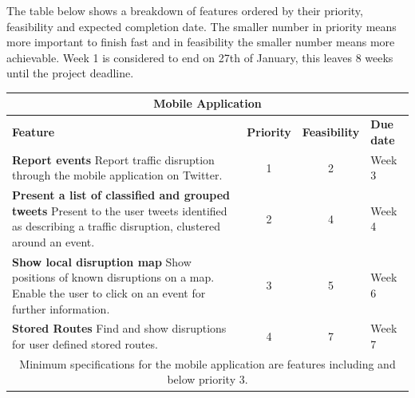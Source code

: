 The table below shows a breakdown of features ordered by their priority, feasibility and expected completion date. The smaller number in priority means more important to finish fast and in feasibility the smaller number means more achievable. Week 1 is considered to end on 27th of January, this leaves 8 weeks until the project deadline.

\begin{center}
\begin{tabular}{ | p{9cm} | c | c | p{1.8cm} | }
\hline
\multicolumn{4}{|c|}{\textbf{Mobile Application}} \\ \hline
\textbf{Feature} & \textbf{Priority} & \textbf{Feasibility} & \textbf{Due date} \\ \hline
\textbf{Report events}\newline
Report traffic disruption through the mobile application on Twitter. & 1 & 2 & Week 3 \\ \hline
\textbf{Present a list of classified and grouped tweets}\newline
Present to the user tweets identified as describing a traffic disruption,
clustered around an event. & 2 & 4 & Week 4 \\ \hline
\textbf{Show local disruption map}\newline
Show positions of known disruptions on a map. Enable the user to click on an event for further information. & 3 & 5 & Week 6 \\ \hline
\textbf{Stored Routes}\newline
Find and show disruptions for user defined stored routes. & 4 & 7 & Week 7 \\ \hline
\multicolumn{4}{|c|}{Minimum specifications for the mobile application are
features including and below priority 3.} \\ \hline
\end{tabular}
\end{center}
